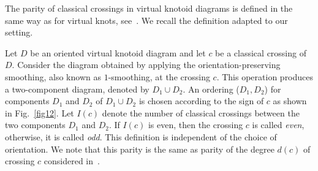 \documentclass[12pt]{amsart}
\theoremstyle{noparens}
\numberwithin{equation}{section}
\numberwithin{equation}{section}
\begin{document}
The parity of classical crossings in virtual knotoid diagrams is defined in the same way as for virtual knots, see~\cite{Man}. We recall the definition adapted to our setting.

Let $D$ be an oriented virtual knotoid diagram and let $c$ be a classical crossing of $D$. Consider the diagram obtained by applying the orientation-preserving smoothing, also known as  $1$-smoothing, at the crossing $c$. This operation produces a two-component diagram, denoted by $D_1 \cup D_2$. An ordering ($D_1, D_2$) for components $D_1$ and $D_2$ of $D_1 \cup D_2$ is chosen according to the sign of $c$ as shown in Fig.~\ref{fig12}. Let $I(c)$ denote the number of classical crossings between the two components $D_1$ and $D_2$. If $I(c)$ is even, then the crossing $c$ is called \textit{even}, otherwise, it is called \textit{odd}.  This definition is independent of the choice of orientation. We note that this parity is the same as parity of the degree $d(c)$ of crossing $c$ considered in~\cite{FLV}. 
\end{document}

